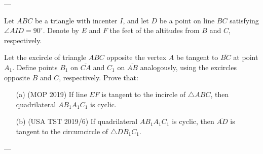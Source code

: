 

---

Let $ABC$ be a triangle with incenter $I$, and let $D$ be a point on line $BC$ satisfying $\angle AID=90^\circ$. Denote by $E$ and $F$ the feet of the altitudes from $B$ and $C$, respectively.

Let the excircle of triangle $ABC$ opposite the vertex $A$ be tangent to $\overline{BC}$ at point $A_1$. Define points $B_1$ on $\overline{CA}$ and $C_1$ on $\overline{AB}$ analogously, using the excircles opposite $B$ and $C$, respectively. Prove that:
\begin{itemize}
    \item[(a)] (MOP 2019) If line $EF$ is tangent to the incircle of $\triangle ABC$, then quadrilateral $AB_1A_1C_1$ is cyclic.
        \vspace{-0.5em}
    \item[(b)] (USA TST 2019/6) If quadrilateral $AB_1A_1C_1$ is cyclic, then $\overline{AD}$ is tangent to the circumcircle of $\triangle DB_1C_1$.
\end{itemize}

---


